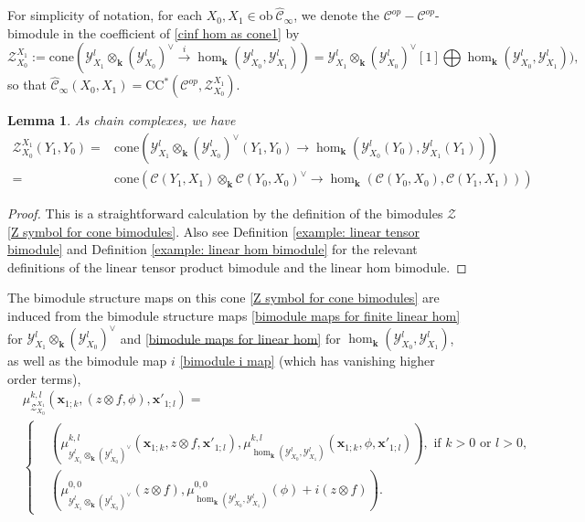 \documentclass[11pt]{amsproc}
\def\K{{\mathbf{k}}}
\def\Y{\mathcal{Y}}
\def\cZ{\mathcal{Z}}
\def\cc{\mathcal{C}}
\def\r#1{\mathrm{#1}}
\def\ob{\mathrm{ob\ }}
\def\cone{\mathrm{cone}}
\def\cinf{\widehat{\cc}_{\infty}}
\newtheorem{lem}{Lemma}[section]
\theoremstyle{remark}
\numberwithin{equation}{section}
\begin{document}
For simplicity of notation, for each $X_{0}, X_{1} \in \ob \cinf$, we denote the $\cc^{op} - \cc^{op}$-bimodule in the coefficient of \eqref{cinf hom as cone1} by
\begin{equation}\label{Z symbol for cone bimodules}
\cZ_{X_{0}}^{X_{1}} := \cone(\Y^{l}_{X_{1}} \otimes_{\K} (\Y^{l}_{X_{0}})^{\vee} \stackrel{i}\to \hom_{\K}(\Y^{l}_{X_{0}}, \Y^{l}_{X_{1}})) = \Y^{l}_{X_{1}} \otimes_{\K} (\Y^{l}_{X_{0}})^{\vee}[1] \bigoplus \hom_{\K}(\Y^{l}_{X_{0}}, \Y^{l}_{X_{1}})),
\end{equation}
so that $\cinf(X_{0}, X_{1}) = \r{CC}^{*}(\cc^{op}, \cZ_{X_{0}}^{X_{1}})$.

\begin{lem}\label{lem: typical chain complex for Z}
As chain complexes, we have
\begin{equation}\label{Z as cone}
\begin{split}
\cZ_{X_{0}}^{X_{1}}(Y_{1}, Y_{0}) = & \cone(\Y^{l}_{X_{1}} \otimes_{\K} (\Y^{l}_{X_{0}})^{\vee}(Y_{1}, Y_{0}) \to \hom_{\K}(\Y^{l}_{X_{0}}(Y_{0}), \Y^{l}_{X_{1}}(Y_{1}))) \\
= & \cone(\cc(Y_{1}, X_{1}) \otimes_{\K} \cc(Y_{0}, X_{0})^{\vee} \to \hom_{\K}(\cc(Y_{0}, X_{0}), \cc(Y_{1}, X_{1}))) 
\end{split}
\end{equation}
\end{lem}
\begin{proof}
This is a straightforward calculation by the definition of the bimodules $\cZ$ \eqref{Z symbol for cone bimodules}.
Also see Definition \ref{example: linear tensor bimodule} and Definition \ref{example: linear hom bimodule} for the relevant definitions of the linear tensor product bimodule and the linear hom bimodule.
\end{proof}

The bimodule structure maps on this cone \eqref{Z symbol for cone bimodules} are induced from the bimodule structure maps \eqref{bimodule maps for finite linear hom} for $\Y^{l}_{X_{1}} \otimes_{\K} (\Y^{l}_{X_{0}})^{\vee}$ and \eqref{bimodule maps for linear hom} for $\hom_{\K}(\Y^{l}_{X_{0}}, \Y^{l}_{X_{1}})$, 
as well as the bimodule map $i$ \eqref{bimodule i map} (which has vanishing higher order terms),
\begin{equation}\label{structure maps for Z}
\begin{split}
 & \mu^{k, l}_{\cZ_{X_{0}}^{X_{1}}}(\mathbf{x}_{1;k}, (z \otimes f, \phi), \mathbf{x}'_{1;l}) =\\
& \begin{cases}
 & (\mu^{k, l}_{\Y^{l}_{X_{1}} \otimes_{\K} (\Y^{l}_{X_{0}})^{\vee}}(\mathbf{x}_{1;k}, z \otimes f, \mathbf{x}'_{1;l}), \mu^{k, l}_{\hom_{\K}(\Y^{l}_{X_{0}}, \Y^{l}_{X_{1}})}(\mathbf{x}_{1;k}, \phi, \mathbf{x}'_{1;l})),  \text{ if } k>0 \text{ or } l>0, \\
& (\mu^{0, 0}_{\Y^{l}_{X_{1}} \otimes_{\K} (\Y^{l}_{X_{0}})^{\vee}}(z \otimes f), \mu^{0, 0}_{\hom_{\K}(\Y^{l}_{X_{0}}, \Y^{l}_{X_{1}})}(\phi) + i(z \otimes f)).
 \end{cases}
 \end{split}
\end{equation}
\end{document}
